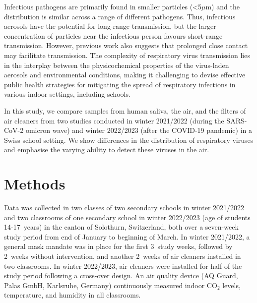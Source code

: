 \documentclass[fleqn,11pt]{wlscirep}
\begin{document}
Infectious pathogens are primarily found in smaller particles (<5$\mu$m) and the distribution is similar across a range of different pathogens\cite{Fennelly2020}. Thus, infectious aerosols have the potential for long-range transmission, but the larger concentration of particles near the infectious person favours short-range transmission\cite{Tellier2009JTRSI,Wang2020,Morawska2020}. However, previous work also suggests that prolonged close contact may facilitate transmission\cite{Leung2020NatMed,Brankston2007LancetID,Lind2023NatCommun}. The complexity of respiratory virus transmission lies in the interplay between the physicochemical properties of the virus-laden aerosols and environmental conditions\cite{Wang2020,Morawska2020}, making it challenging to devise effective public health strategies for mitigating the spread of respiratory infections in various indoor settings, including schools.

In this study, we compare samples from human saliva, the air, and the filters of air cleaners from two studies conducted in winter 2021/2022 (during the SARS-CoV-2 omicron wave)\cite{Banholzer2023PLoSMed} and winter 2022/2023 (after the COVID-19 pandemic)\cite{Banholzer2023submitted} in a Swiss school setting. We show differences in the distribution of respiratory viruses and emphasise the varying ability to detect these viruses in the air. 


\section*{Methods}

Data was collected in two classes of two secondary schools in winter 2021/2022 and two classrooms of one secondary school in winter 2022/2023 (age of students 14-17~years) in the canton of Solothurn, Switzerland, both over a seven-week study period from end of January to beginning of March. In winter 2021/2022, a general mask mandate was in place for the first 3~study weeks, followed by 2~weeks without intervention, and another 2~weeks of air cleaners installed in two classrooms. In winter 2022/2023, air cleaners were installed for half of the study period following a cross-over design. An air quality device (AQ Guard, Palas GmbH, Karlsruhe, Germany) continuously measured indoor CO$_2$ levels, temperature, and humidity in all classrooms. 
\end{document}
